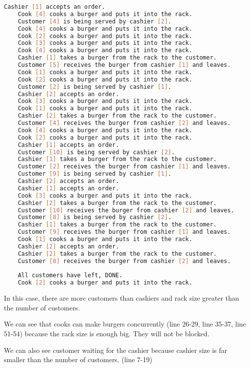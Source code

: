\begin{lstlisting}[language=bash]
    Cashier [1] accepts an order.
    Cook [4] cooks a burger and puts it into the rack.
    Customer [4] is being served by cashier [2].
    Cook [4] cooks a burger and puts it into the rack.
    Cook [2] cooks a burger and puts it into the rack.
    Cook [3] cooks a burger and puts it into the rack.
    Cook [4] cooks a burger and puts it into the rack.
    Cashier [1] takes a burger from the rack to the customer.
    Customer [5] receives the burger from cashier [1] and leaves.
    Cook [1] cooks a burger and puts it into the rack.
    Cook [2] cooks a burger and puts it into the rack.
    Customer [2] is being served by cashier [1].
    Cashier [2] accepts an order.
    Cook [3] cooks a burger and puts it into the rack.
    Cook [1] cooks a burger and puts it into the rack.
    Cashier [2] takes a burger from the rack to the customer.
    Customer [4] receives the burger from cashier [2] and leaves.
    Cook [4] cooks a burger and puts it into the rack.
    Cook [2] cooks a burger and puts it into the rack.
    Cashier [1] accepts an order.
    Customer [10] is being served by cashier [2].
    Cashier [1] takes a burger from the rack to the customer.
    Customer [2] receives the burger from cashier [1] and leaves.
    Customer [9] is being served by cashier [1].
    Cashier [2] accepts an order.
    Cashier [1] accepts an order.
    Cook [3] cooks a burger and puts it into the rack.
    Cashier [2] takes a burger from the rack to the customer.
    Customer [10] receives the burger from cashier [2] and leaves.
    Customer [8] is being served by cashier [2].
    Cashier [1] takes a burger from the rack to the customer.
    Customer [9] receives the burger from cashier [1] and leaves.
    Cook [1] cooks a burger and puts it into the rack.
    Cashier [2] accepts an order.
    Cashier [2] takes a burger from the rack to the customer.
    Customer [8] receives the burger from cashier [2] and leaves.
    
    All customers have left, DONE.
    Cook [2] cooks a burger and puts it into the rack.

\end{lstlisting}

In this case, there are more customers than cashiers and rack size greater than the number of customers.

We can see that cooks can make burgers concurrently (line 26-29, line 35-37, line 51-54) because the rack size is enough big. They will not be blocked. 

We can also see customer waiting for the cashier because cashier size is far smaller than the number of customers. (line 7-19)

